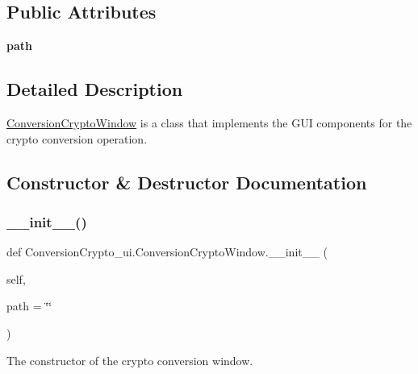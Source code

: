 \subsection*{Public Attributes}
\begin{DoxyCompactItemize}
\item 
\mbox{\label{class_conversion_crypto__ui_1_1_conversion_crypto_window_af293f3d2991869ffc4859104d09dde98}} 
{\bfseries path}
\end{DoxyCompactItemize}


\subsection{Detailed Description}
\hyperlink{class_conversion_crypto__ui_1_1_conversion_crypto_window}{Conversion\+Crypto\+Window} is a class that implements the G\+UI components for the crypto conversion operation. 

\subsection{Constructor \& Destructor Documentation}
\mbox{\label{class_conversion_crypto__ui_1_1_conversion_crypto_window_a2c076dd5a4c7905c9e8898ace06516ad}} 
\subsubsection{\texorpdfstring{\+\_\+\+\_\+init\+\_\+\+\_\+()}{\_\_init\_\_()}}
{\footnotesize\ttfamily def Conversion\+Crypto\+\_\+ui.\+Conversion\+Crypto\+Window.\+\_\+\+\_\+init\+\_\+\+\_\+ (\begin{DoxyParamCaption}\item[{}]{self,  }\item[{}]{path = {\ttfamily \char`\"{}\char`\"{}} }\end{DoxyParamCaption})}



The constructor of the crypto conversion window. 

